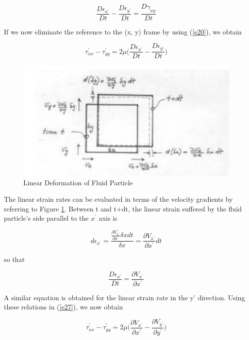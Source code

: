 \documentclass{article}
\begin{document}
{\begin{equation} \label{e25}
\frac{D\epsilon_{x^{'}}}{Dt} - \frac{D\epsilon_{y^{'}}}{Dt} = \frac{D\gamma_{xy}}{Dt} 
\end{equation}

If we now eliminate the reference to the (x, y) frame by using (\ref{e20}), we obtain

\begin{equation}\label{e26}
\tau^{'}_{xx} - \tau^{'}_{yy} = 2\mu \bigg(\frac{D\epsilon_{x^{'}}}{Dt} - \frac{D\epsilon_{y^{'}}}{Dt}\bigg)
\end{equation}

\begin{figure}[h!]
\centering
\includegraphics[scale=.9]{Linear Deformation of Fluid Particle.jpg}
\caption{Linear Deformation of Fluid Particle}
\label{fig:Linr_dfrmtn_of_fld_prtcl}
\end{figure}

The linear strain rates can be evaluated in terms of the velocity gradients by referring to Figure \ref{fig:Linr_dfrmtn_of_fld_prtcl}. Between t and t+dt, the linear strain suffered by the fluid particle's side parallel to the $x^{'}$ axis is

$$d\epsilon_{x^{'}} = \frac{\frac{\partial V_{x^{'}}}{\partial x^{'}}\delta x dt}{\delta x} = \frac{\partial V_{x^{'}}}{\partial x^{'}}dt$$

so that 

\begin{equation} \label{e27}
\frac{D\epsilon_{x^{'}}}{Dt} = \frac{\partial V_{x^{'}}}{\partial x^{'}}
\end{equation}

A similar equation is obtained for the linear strain rate in the y' direction. Using these
relations in (\ref{e27}), we now obtain

\begin{equation} \label{e28}
\tau^{'}_{xx} - \tau^{'}_{yy} = 2\mu \bigg(\frac{\partial V_{x^{'}}}{\partial x^{'}} - \frac{\partial V_{y^{'}}}{\partial y^{'}}\bigg)
\end{equation}

}
\end{document}
